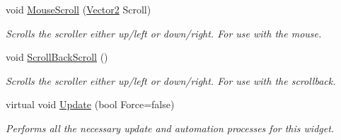 \begin{DoxyCompactItemize}
void \hyperlink{classphys_1_1UI_1_1Scrollbar_a27e252073b9987b274b574f8159de87e}{MouseScroll} (\hyperlink{classphys_1_1Vector2}{Vector2} Scroll)
\begin{DoxyCompactList}\small\item\em Scrolls the scroller either up/left or down/right. For use with the mouse. \item\end{DoxyCompactList}\item 
void \hyperlink{classphys_1_1UI_1_1Scrollbar_a1c6ca6b135d09d284b31fda2230c9286}{ScrollBackScroll} ()
\begin{DoxyCompactList}\small\item\em Scrolls the scroller either up/left or down/right. For use with the scrollback. \item\end{DoxyCompactList}\item 
virtual void \hyperlink{classphys_1_1UI_1_1Scrollbar_a628999b4caa32f3c273d45e64d5c62a0}{Update} (bool Force=false)
\begin{DoxyCompactList}\small\item\em Performs all the necessary update and automation processes for this widget. \item\end{DoxyCompactList}\end{DoxyCompactItemize}

